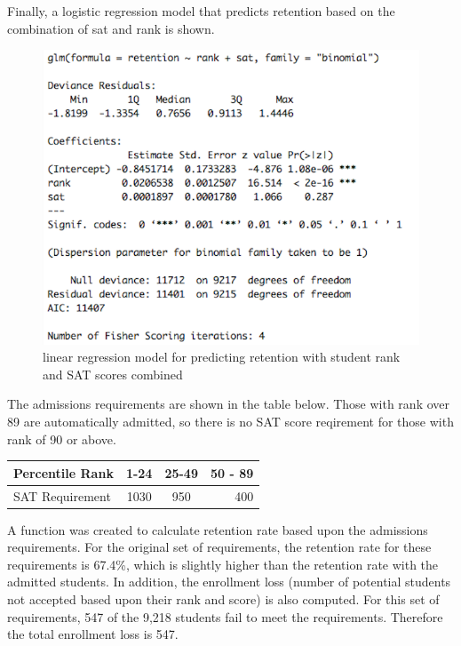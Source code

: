 \documentclass{article}
\begin{document}
Finally, a logistic  regression model that predicts retention based on the combination of sat and rank is shown.

\begin{figure}[H]
\begin{center}
\includegraphics[scale=0.5]{retentionranksat}
\end{center}
\caption{linear regression model for predicting retention with student rank and SAT scores combined}
\end{figure}

The admissions requirements are shown in the table below. 
Those with rank over 89 are automatically admitted, so there is no SAT score 
reqirement for those with rank of 90 or above. 

\begin{center}
\begin{tabular}{|l|c|c|r|}
\hline
Percentile Rank & 1-24 & 25-49 & 50 - 89 \\ \hline
SAT Requirement & 1030 & 950 & 400 \\ \hline
\end{tabular}
\end{center}

A function was created to calculate retention rate based upon 
the admissions requirements. For the original set of requirements, the retention rate
for these requirements is 67.4\%, which is slightly higher than the retention rate with the 
admitted students. In addition, the enrollment loss (number of potential students 
not accepted based upon their rank and score) is also computed. For this set of requirements, 
547 of the 9,218 students fail to meet the requirements. Therefore the total enrollment loss is 
547. 
\end{document}

